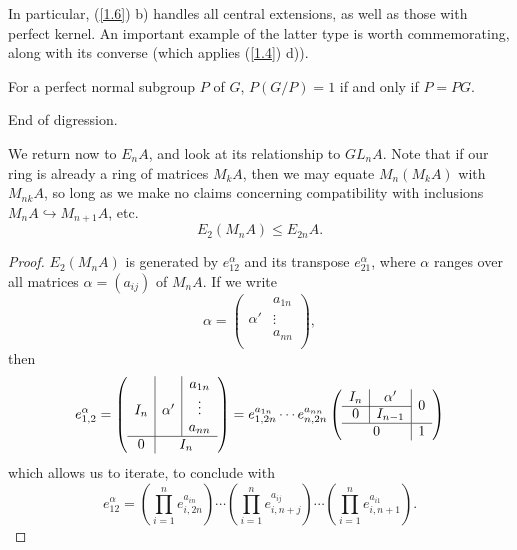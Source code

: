 In particular, (\ref{1.6}) b) handles all central extensions, as well as those with perfect kernel. An important example of the latter type is worth commemorating, along with its converse (which applies (\ref{1.4}) d)).
\begin{prop}
For a perfect normal subgroup $P$ of $G$, $P(G/P)=1$ if and only if $P=PG$.
\end{prop}
End of digression.

We return now to $E_n A$, and look at its relationship to $GL_nA$. Note that if our ring is already a ring of matrices $M_kA$, then we may equate $M_n(M_k A)$ with $M_{nk}A$, so long as we make no claims concerning compatibility with inclusions $M_nA\hookrightarrow M_{n+1}A$, etc.\ 
\begin{equation}
  E_2(M_nA)\leqslant E_{2n}A.
\end{equation}

\begin{proof}
$E_2(M_nA)$ is generated by $e_{12}^\alpha$ and its transpose $e_{21}^\alpha$, where $\alpha$ ranges over all matrices
$\alpha=(a_{ij})$ of $M_nA$. If we write
\[\alpha=\left(
\begin{array}{c|c}
 & a_{1n}\\
\alpha' &\vdots\\
& a_{nn}\\
\end{array}\right), \]
then
\[e_{1,2}^{\alpha}=\left(
\begin{array}{c|c|c}
 & & a_{1n}\\
I_n& \alpha' &\vdots\\
& & a_{nn}\\
\hline
0& \multicolumn{2}{c}{I_n}
\end{array}\right)=e_{1,2n}^{a_{1n}}\cdots e_{n,2n}^{a_{nn}}\left(
\begin{array}{c|c|c}
I_n & \alpha'& \multirow{2}*{0}\\
\cline{1-2}
0&I_{n-1} & \\
\hline
\multicolumn{2}{c|}{0}& 1\\
\end{array}\right) \]
which allows us to iterate, to conclude with
\[e_{12}^{\alpha}=(\prod_{i=1}^n e_{i,2n}^{a_{in}})\cdots(\prod_{i=1}^n e_{i,n+j}^{a_{ij}})\cdots(\prod_{i=1}^n e_{i,n+1}^{a_{i1}}).\]
\end{proof}

